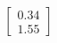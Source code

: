 \documentclass[preview]{standalone}
\begin{document}
\begin{align*}
\begin{bmatrix} 0.34 \\ 1.55 \end{bmatrix}
\end{align*}
\end{document}
